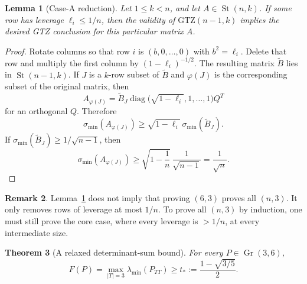 \documentclass[11pt]{article}
\numberwithin{equation}{section}
\newtheorem{theorem}{Theorem}[section]
\newtheorem{lemma}[theorem]{Lemma}
\theoremstyle{definition}
\newtheorem{remark}[theorem]{Remark}
\newcommand{\St}{\operatorname{St}}
\newcommand{\Gr}{\operatorname{Gr}}
\newcommand{\diag}{\operatorname{diag}}
\newcommand{\smin}{\sigma_{\min}}
\begin{document}
\begin{lemma}[Case-A reduction]\label{lem:caseA}
Let $1\le k<n$, and let $A\in\St(n,k)$.  If some row has leverage
$\ell_i\le 1/n$, then the validity of $\mathrm{GTZ}(n-1,k)$ implies the desired
GTZ conclusion for this particular matrix $A$.
\end{lemma}

\begin{proof}
Rotate columns so that row $i$ is $(b,0,\ldots,0)$ with $b^2=\ell_i$.  Delete
that row and multiply the first column by $(1-\ell_i)^{-1/2}$.  The resulting
matrix $\widetilde B$ lies in $\St(n-1,k)$.  If $J$ is a $k$-row subset of
$\widetilde B$ and $\varphi(J)$ is the corresponding subset of the original
matrix, then
\[
  A_{\varphi(J)}=\widetilde B_J
  \diag\bigl(\sqrt{1-\ell_i},1,\ldots,1\bigr)Q^T
\]
for an orthogonal $Q$.  Therefore
\[
  \smin(A_{\varphi(J)})
  \ge \sqrt{1-\ell_i}\,\smin(\widetilde B_J).
\]
If $\smin(\widetilde B_J)\ge1/\sqrt{n-1}$, then
\[
  \smin(A_{\varphi(J)})
  \ge \sqrt{1-\frac1n}\,\frac1{\sqrt{n-1}}
  =\frac1{\sqrt n}.
\]
\end{proof}

\begin{remark}
Lemma~\ref{lem:caseA} does not imply that proving $(6,3)$ proves all $(n,3)$.
It only removes rows of leverage at most $1/n$.  To prove all $(n,3)$ by
induction, one must still prove the core case, where every leverage is $>1/n$,
at every intermediate size.
\end{remark}

\begin{theorem}[A relaxed determinant-sum bound]\label{thm:det-relaxed}
For every $P\in\Gr(3,6)$,
\[
  F(P)=\max_{|T|=3}\lambda_{\min}(P_{TT})
  \ge t_*:=\frac{1-\sqrt{3/5}}2.
\]
\end{theorem}
\end{document}
